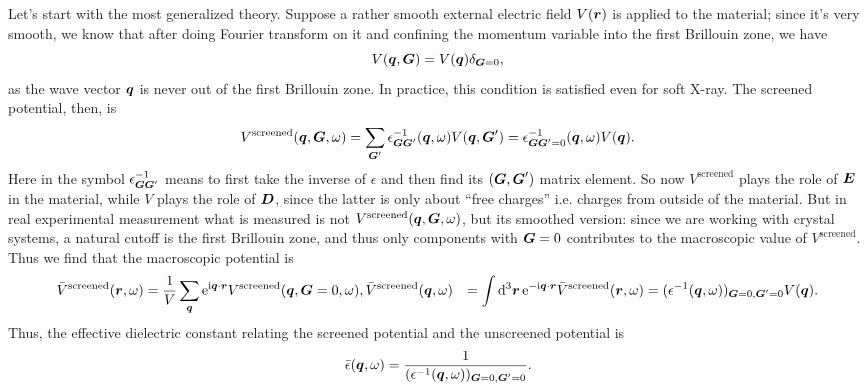 \documentclass[hyperref, a4paper, 12pt]{report}
\newcommand*{\ii}{\mathrm{i}}
\newcommand*{\ee}{\mathrm{e}}
\def\\{}%
\begin{document}
Let's start with the most generalized theory.
Suppose a rather smooth external electric field $V(\vb*{r})$ is applied to the material;
since it's very smooth, 
we know that after doing Fourier transform on it 
and confining the momentum variable into the first Brillouin zone, 
we have 
\begin{equation}
    V(\vb*{q}, \vb*{G}) = V(\vb*{q}) \delta_{\vb*{G} = 0},
\end{equation}
as the wave vector $\vb*{q}$ 
is never out of the first Brillouin zone. 
In practice, this condition is satisfied even for soft X-ray. 
The screened potential, then, is 
\begin{equation}
    V^{\text{screened}}(\vb*{q}, \vb*{G}, \omega) = 
    \sum_{\vb*{G}'} \epsilon^{-1}_{\vb*{G} \vb*{G}'} (\vb*{q}, \omega) 
    V(\vb*{q}, \vb*{G}')
    = \epsilon^{-1}_{\vb*{G} \vb*{G}' = 0} (\vb*{q}, \omega) 
    V(\vb*{q}).
\end{equation}
Here in the symbol $\epsilon^{-1}_{\vb*{G} \vb*{G}'}$
means to first take the inverse of $\epsilon$
and then find its $(\vb*{G}, \vb*{G}')$ matrix element.
So now $V^{\text{screened}}$ plays the role of $\vb*{E}$ in the material,
while $V$ plays the role of $\vb*{D}$,
since the latter is only about ``free charges''
i.e. charges from outside of the material.
But in real experimental measurement what is measured is not $V^{\text{screened}}(\vb*{q}, \vb*{G}, \omega)$,
but its smoothed version:
since we are working with crystal systems, 
a natural cutoff is the first Brillouin zone, 
and thus only components with $\vb*{G} = 0$ contributes 
to the macroscopic value of $V^{\text{screened}}$.
Thus we find that the macroscopic potential is  
\begin{equation}
    \begin{aligned}
        \bar{V}^{\text{screened}}(\vb*{r}, \omega) &= \frac{1}{V} \sum_{\vb*{q}} \ee^{\ii \vb*{q} \cdot \vb*{r}}
        V^{\text{screened}} (\vb*{q}, \vb*{G} = 0, \omega) , \\
        \bar{V}^{\text{screened}}(\vb*{q}, \omega)
        &= \int \dd[3]{\vb*{r}} \ee^{- \ii \vb*{q} \cdot \vb*{r}} \bar{V}^{\text{screened}}(\vb*{r}, \omega)
        = (\epsilon^{-1}(\vb*{q}, \omega))_{\vb*{G} = 0, \vb*{G}' = 0} V(\vb*{q}).
    \end{aligned}
\end{equation}
Thus, the effective dielectric constant relating 
the screened potential and the unscreened potential is 
\begin{equation}
    \bar{\epsilon}(\vb*{q}, \omega) = \frac{1}{
        (\epsilon^{-1}(\vb*{q}, \omega))_{\vb*{G} = 0, \vb*{G}' = 0}
    }.
    \label{eq:macroscopic-dielectric}
\end{equation}
\end{document}
